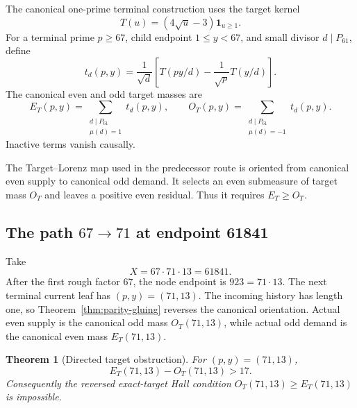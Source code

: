 \documentclass[11pt]{article}
\newtheorem{theorem}{Theorem}[section]
\newcommand{\1}{\mathbf 1}
\begin{document}
The canonical one-prime terminal construction uses the target kernel
\begin{equation}
 T(u)=(4\sqrt u-3)\1_{u\ge1}.
 \label{eq:T}
\end{equation}
For a terminal prime $p\ge67$, child endpoint $1\le y<67$, and small divisor
$d\mid P_{61}$, define
\begin{equation}
 t_d(p,y)=\frac1{\sqrt d}
 \left[T(py/d)-\frac1{\sqrt p}T(y/d)\right].
 \label{eq:target-atom}
\end{equation}
The canonical even and odd target masses are
\begin{equation}
 E_T(p,y)=\sum_{\substack{d\mid P_{61}\\ \mu(d)=1}}t_d(p,y),
 \qquad
 O_T(p,y)=\sum_{\substack{d\mid P_{61}\\ \mu(d)=-1}}t_d(p,y).
 \label{eq:EO}
\end{equation}
Inactive terms vanish causally.

The Target--Lorenz map used in the predecessor route is oriented from canonical
even supply to canonical odd demand.  It selects an even submeasure of target
mass $O_T$ and leaves a positive even residual.  Thus it requires $E_T\ge O_T$.

\subsection{The path \texorpdfstring{$67\to71$}{67 to 71} at endpoint 61841}

Take
\begin{equation}
 X=67\cdot71\cdot13=61841.
 \label{eq:X-obstruction}
\end{equation}
After the first rough factor $67$, the node endpoint is $923=71\cdot13$.  The
next terminal current leaf has $(p,y)=(71,13)$.  The incoming history has length
one, so Theorem~\ref{thm:parity-gluing} reverses the canonical orientation.
Actual even supply is the canonical odd mass $O_T(71,13)$, while actual odd
demand is the canonical even mass $E_T(71,13)$.

\begin{theorem}[Directed target obstruction]
\label{thm:target-obstruction}
For $(p,y)=(71,13)$,
\begin{equation}
 E_T(71,13)-O_T(71,13)>17.
 \label{eq:gap17}
\end{equation}
Consequently the reversed exact-target Hall condition
$O_T(71,13)\ge E_T(71,13)$ is impossible.
\end{theorem}
\end{document}
